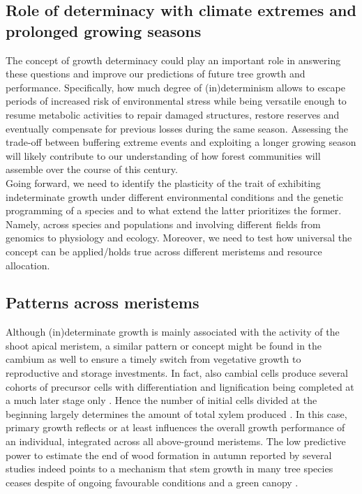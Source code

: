 \documentclass{article}
\begin{document}
\subsection*{Role of determinacy with climate extremes and prolonged growing seasons}
The concept of growth determinacy could play an important role in answering these questions and improve our predictions of future tree growth and performance. Specifically, how much degree of (in)determinism allows to escape periods of increased risk of environmental stress while being versatile enough to resume metabolic activities to repair damaged structures, restore reserves and eventually compensate for previous losses during the same season. Assessing the trade-off between buffering extreme events and exploiting a longer growing season will likely contribute to our understanding of how forest communities will assemble over the course of this century.\\

Going forward, we need to identify the plasticity of the trait of exhibiting indeterminate growth under different environmental conditions and the genetic programming of a species and to what extend the latter prioritizes the former. Namely, across species and populations and involving different fields from genomics to physiology and ecology. Moreover, we need to test how universal the concept can be applied/holds true across different meristems and resource allocation. %

\subsection*{Patterns across meristems}
Although (in)determinate growth is mainly associated with the activity of the shoot apical meristem, a similar pattern or concept might be found in the cambium as well to ensure a timely switch from vegetative growth to reproductive and storage investments. In fact, also cambial cells produce several cohorts of precursor cells with differentiation and lignification being completed at a much later stage only \citep{valdovinos-ayalaSeasonalPatternsIncreases2022}. Hence the number of initial cells divided at the beginning largely determines the amount of total xylem produced \cite{lupiXylemPhenologyWood2010}. In this case, primary growth reflects or at least influences the overall growth performance of an individual, integrated across all above-ground meristems. The low predictive power to estimate the end of wood formation in autumn reported by several studies \cite{buttoComparingCellDynamics2020} indeed points to a mechanism that stem growth in many tree species ceases despite of ongoing favourable conditions and a  green canopy \cite{arendStemGrowthPhenology2024}.\\
\end{document}
